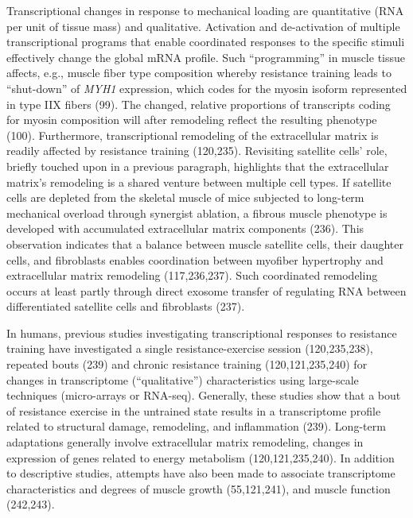 \documentclass[twoside,10pt]{gihclass} %
\begin{document}
Transcriptional changes in response to mechanical loading are quantitative (RNA per unit of tissue mass) and qualitative. Activation and de-activation of multiple transcriptional programs that enable coordinated responses to the specific stimuli effectively change the global mRNA profile.
Such ``programming'' in muscle tissue affects, e.g., muscle fiber type composition whereby resistance training leads to ``shut-down'' of \emph{MYH1} expression, which codes for the myosin isoform represented in type IIX fibers
(99).
The changed, relative proportions of transcripts coding for myosin composition will after remodeling reflect the resulting phenotype
(100).
Furthermore, transcriptional remodeling of the extracellular matrix is readily affected by resistance training
(120,235).
Revisiting satellite cells' role, briefly touched upon in a previous paragraph, highlights that the extracellular matrix's remodeling is a shared venture between multiple cell types.
If satellite cells are depleted from the skeletal muscle of mice subjected to long-term mechanical overload through synergist ablation, a fibrous muscle phenotype is developed with accumulated extracellular matrix components
(236).
This observation indicates that a balance between muscle satellite cells, their daughter cells, and fibroblasts enables coordination between myofiber hypertrophy and extracellular matrix remodeling
(117,236,237).
Such coordinated remodeling occurs at least partly through direct exosome transfer of regulating RNA between differentiated satellite cells and fibroblasts
(237).

In humans, previous studies investigating transcriptional responses to resistance training have investigated a single resistance-exercise session
(120,235,238),
repeated bouts
(239)
and chronic resistance training
(120,121,235,240)
for changes in transcriptome (``qualitative'') characteristics using large-scale techniques (micro-arrays or RNA-seq).
Generally, these studies show that a bout of resistance exercise in the untrained state results in a transcriptome profile related to structural damage, remodeling, and inflammation
(239).
Long-term adaptations generally involve extracellular matrix remodeling, changes in expression of genes related to energy metabolism
(120,121,235,240).
In addition to descriptive studies, attempts have also been made to associate transcriptome characteristics and degrees of muscle growth
(55,121,241),
and muscle function
(242,243).
\end{document}
